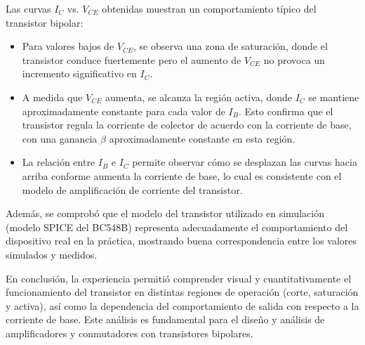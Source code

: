 Las curvas $I_C$ vs. $V_{CE}$ obtenidas muestran un comportamiento típico del transistor bipolar:

\begin{itemize}
    \item Para valores bajos de $V_{CE}$, se observa una zona de saturación, donde el transistor conduce fuertemente pero el aumento de $V_{CE}$ no provoca un incremento significativo en $I_C$.
    
    \item A medida que $V_{CE}$ aumenta, se alcanza la región activa, donde $I_C$ se mantiene aproximadamente constante para cada valor de $I_B$. Esto confirma que el transistor regula la corriente de colector de acuerdo con la corriente de base, con una ganancia $\beta$ aproximadamente constante en esta región.
    
    \item La relación entre $I_B$ e $I_C$ permite observar cómo se desplazan las curvas hacia arriba conforme aumenta la corriente de base, lo cual es consistente con el modelo de amplificación de corriente del transistor.
\end{itemize}

Además, se comprobó que el modelo del transistor utilizado en simulación (modelo SPICE del BC548B) representa adecuadamente el comportamiento del dispositivo real en la práctica, mostrando buena correspondencia entre los valores simulados y medidos.

En conclusión, la experiencia permitió comprender visual y cuantitativamente el funcionamiento del transistor en distintas regiones de operación (corte, saturación y activa), así como la dependencia del comportamiento de salida con respecto a la corriente de base. Este análisis es fundamental para el diseño y análisis de amplificadores y conmutadores con transistores bipolares.

\newpage

